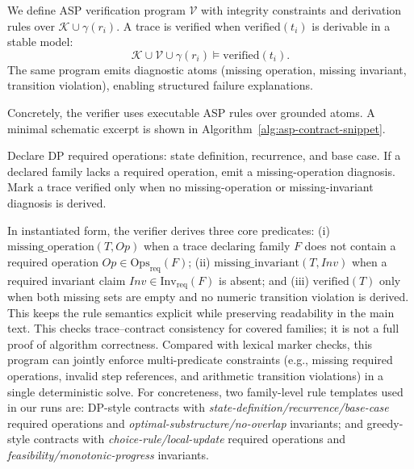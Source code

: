 \documentclass{article}
\begin{document}
We define ASP verification program \(\mathcal{V}\) with integrity constraints and derivation rules over \(\mathcal{K}\cup\gamma(r_i)\). A trace is verified when \(\mathrm{verified}(t_i)\) is derivable in a stable model:
\begin{equation}
\label{eq:verified-semantics}
\mathcal{K}\cup\mathcal{V}\cup\gamma(r_i)\models \mathrm{verified}(t_i).
\end{equation}
The same program emits diagnostic atoms (missing operation, missing invariant, transition violation), enabling structured failure explanations.

Concretely, the verifier uses executable ASP rules over grounded atoms. A minimal schematic excerpt is shown in Algorithm~\ref{alg:asp-contract-snippet}.
\begin{algorithm}[t]
\caption{Schematic ASP Contract Rules}
\label{alg:asp-contract-snippet}
\begin{algorithmic}[1]
\STATE Declare DP required operations: state definition, recurrence, and base case.
\STATE If a declared family lacks a required operation, emit a missing-operation diagnosis.
\STATE Mark a trace verified only when no missing-operation or missing-invariant diagnosis is derived.
\end{algorithmic}
\end{algorithm}
In instantiated form, the verifier derives three core predicates: (i) \(\mathrm{missing\_operation}(T,Op)\) when a trace declaring family \(F\) does not contain a required operation \(Op\in\mathrm{Ops}_{\mathrm{req}}(F)\); (ii) \(\mathrm{missing\_invariant}(T,Inv)\) when a required invariant claim \(Inv\in\mathrm{Inv}_{\mathrm{req}}(F)\) is absent; and (iii) \(\mathrm{verified}(T)\) only when both missing sets are empty and no numeric transition violation is derived. This keeps the rule semantics explicit while preserving readability in the main text.
This checks trace--contract consistency for covered families; it is not a full proof of algorithm correctness.
Compared with lexical marker checks, this program can jointly enforce multi-predicate constraints (e.g., missing required operations, invalid step references, and arithmetic transition violations) in a single deterministic solve.
For concreteness, two family-level rule templates used in our runs are: DP-style contracts with \emph{state-definition/recurrence/base-case} required operations and \emph{optimal-substructure/no-overlap} invariants; and greedy-style contracts with \emph{choice-rule/local-update} required operations and \emph{feasibility/monotonic-progress} invariants.
\end{document}

